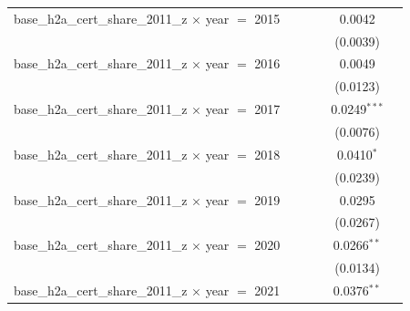 \begin{tabular}{lccccc}
   base\_h2a\_cert\_share\_2011\_z $\times$ year $=$ 2015       &                    &                 &                       & 0.0042                     &   \\   
                                                                &                    &                 &                       & (0.0039)                   &   \\   
   base\_h2a\_cert\_share\_2011\_z $\times$ year $=$ 2016       &                    &                 &                       & 0.0049                     &   \\   
                                                                &                    &                 &                       & (0.0123)                   &   \\   
   base\_h2a\_cert\_share\_2011\_z $\times$ year $=$ 2017       &                    &                 &                       & 0.0249$^{***}$             &   \\   
                                                                &                    &                 &                       & (0.0076)                   &   \\   
   base\_h2a\_cert\_share\_2011\_z $\times$ year $=$ 2018       &                    &                 &                       & 0.0410$^{*}$               &   \\   
                                                                &                    &                 &                       & (0.0239)                   &   \\   
   base\_h2a\_cert\_share\_2011\_z $\times$ year $=$ 2019       &                    &                 &                       & 0.0295                     &   \\   
                                                                &                    &                 &                       & (0.0267)                   &   \\   
   base\_h2a\_cert\_share\_2011\_z $\times$ year $=$ 2020       &                    &                 &                       & 0.0266$^{**}$              &   \\   
                                                                &                    &                 &                       & (0.0134)                   &   \\   
   base\_h2a\_cert\_share\_2011\_z $\times$ year $=$ 2021       &                    &                 &                       & 0.0376$^{**}$              &   \\   

\end{tabular}
